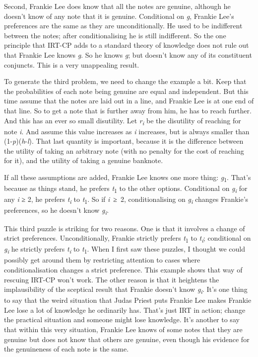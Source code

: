 \documentclass[
  10pt,
  letterpaper,
  twoside]{scrbook}
\begin{document}
Second, Frankie Lee does know that all the notes are genuine, although
he doesn't know of any note that it is genuine. Conditional on \emph{g},
Frankie Lee's preferences are the same as they are unconditionally. He
used to be indifferent between the notes; after conditionalising he is
still indifferent. So the one principle that IRT-CP adds to a standard
theory of knowledge does not rule out that Frankie Lee knows \emph{g}.
So he knows \emph{g}; but doesn't know any of its constituent conjuncts.
This is a very unappealing result.

To generate the third problem, we need to change the example a bit. Keep
that the probabilities of each note being genuine are equal and
independent. But this time assume that the notes are laid out in a line,
and Frankie Lee is at one end of that line. So to get a note that is
further away from him, he has to reach further. And this has an ever so
small disutility. Let \emph{r\textsubscript{i}} be the disutility of
reaching for note \emph{i}. And assume this value increases as \emph{i}
increases, but is always smaller than (1-\emph{p})(\emph{h}-\emph{l}).
That last quantity is important, because it is the difference between
the utility of taking an arbitrary note (with no penalty for the cost of
reaching for it), and the utility of taking a genuine banknote.

If all these assumptions are added, Frankie Lee knows one more thing:
\emph{g}\textsubscript{1}. That's because as things stand, he prefers
\emph{t}\textsubscript{1} to the other options. Conditional on
\emph{g\textsubscript{i}} for any \emph{i} ≥ 2, he prefers
\emph{t\textsubscript{i}} to \emph{t}\textsubscript{1}. So if
\emph{i}~≥~2, conditionalising on \emph{g\textsubscript{i}} changes
Frankie's preferences, so he doesn't know \emph{g\textsubscript{i}}.

This third puzzle is striking for two reasons. One is that it involves a
change of strict preferences. Unconditionally, Frankie strictly prefers
\emph{t}\textsubscript{1} to \emph{t\textsubscript{i}}; conditional on
\emph{g\textsubscript{i}} he strictly prefers \emph{t\textsubscript{i}}
to \emph{t}\textsubscript{1}. When I first saw these puzzles, I thought
we could possibly get around them by restricting attention to cases
where conditionalisation changes a strict preference. This example shows
that way of rescuing IRT-CP won't work. The other reason is that it
heightens the implausibility of the sceptical result that Frankie
doesn't know \emph{g\textsubscript{i}}. It's one thing to say that the
weird situation that Judas Priest puts Frankie Lee makes Frankie Lee
lose a lot of knowledge he ordinarily has. That's just IRT in action;
change the practical situation and someone might lose knowledge. It's
another to say that within this very situation, Frankie Lee knows of
some notes that they are genuine but does not know that others are
genuine, even though his evidence for the genuineness of each note is
the same.
\end{document}
